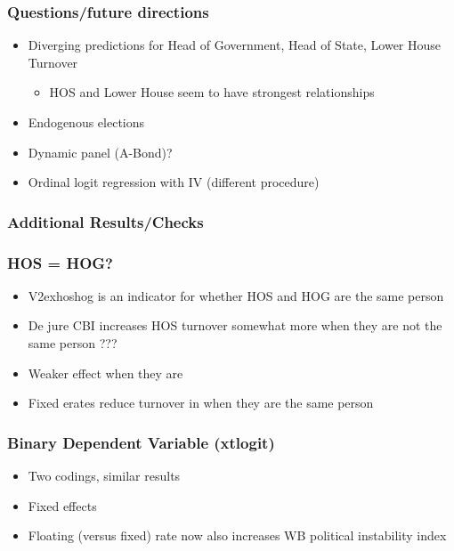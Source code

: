 \documentclass[]{beamer}
\begin{document}
    \begin{frame}
        \frametitle{Questions/future directions}
        \begin{itemize}
            \item Diverging predictions for Head of Government, Head of State, Lower House Turnover
            \begin{itemize}
                \item HOS and Lower House seem to have strongest relationships
            \end{itemize}
            \item Endogenous elections
            \item Dynamic panel (A-Bond)?
            \item Ordinal logit regression with IV (different procedure)
        \end{itemize}
    \end{frame}


    \begin{frame}
        \frametitle{Additional Results/Checks}
    \end{frame}


    \begin{frame}
        \frametitle{HOS = HOG?}
        \begin{itemize}
            \item V2exhoshog is an indicator for whether HOS and HOG are the same person
            \item De jure CBI increases HOS turnover somewhat more when they are not the same person ???
            \item Weaker effect when they are
            \item Fixed erates reduce turnover in when they are the same person
        \end{itemize}
    \end{frame}


    \begin{frame}
    \frametitle{Binary Dependent Variable (xtlogit)}
        \begin{itemize}
            \item Two codings, similar results
            \item Fixed effects
            \item Floating (versus fixed) rate now also increases WB political instability index
        \end{itemize}
    \end{frame}
\end{document}
